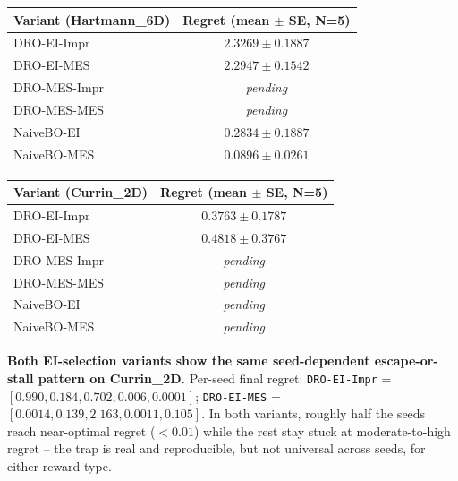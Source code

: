 \documentclass[11pt]{article}
\begin{document}
\begin{center}
\begin{tabular}{lc}
\toprule
\textbf{Variant (Hartmann\_6D)} & \textbf{Regret (mean $\pm$ SE, N=5)} \\
\midrule
DRO-EI-Impr   & $2.3269 \pm 0.1887$ \\
DRO-EI-MES    & $2.2947 \pm 0.1542$ \\
DRO-MES-Impr  & \emph{pending} \\
DRO-MES-MES   & \emph{pending} \\
NaiveBO-EI    & $\mathbf{0.2834 \pm 0.1887}$ \\
NaiveBO-MES   & $\mathbf{0.0896 \pm 0.0261}$ \\
\bottomrule
\end{tabular}
\qquad
\begin{tabular}{lc}
\toprule
\textbf{Variant (Currin\_2D)} & \textbf{Regret (mean $\pm$ SE, N=5)} \\
\midrule
DRO-EI-Impr   & $0.3763 \pm 0.1787$ \\
DRO-EI-MES    & $0.4818 \pm 0.3767$ \\
DRO-MES-Impr  & \emph{pending} \\
DRO-MES-MES   & \emph{pending} \\
NaiveBO-EI    & \emph{pending} \\
NaiveBO-MES   & \emph{pending} \\
\bottomrule
\end{tabular}
\end{center}

\textbf{Both EI-selection variants show the same seed-dependent
escape-or-stall pattern on Currin\_2D.} Per-seed final regret:
\texttt{DRO-EI-Impr} = $[0.990, 0.184, 0.702, 0.006, 0.0001]$;
\texttt{DRO-EI-MES} = $[0.0014, 0.139, 2.163, 0.0011, 0.105]$. In both variants,
roughly half the seeds reach near-optimal regret ($<0.01$) while the rest stay
stuck at moderate-to-high regret -- the trap is real and reproducible, but not
universal across seeds, for either reward type.
\end{document}
